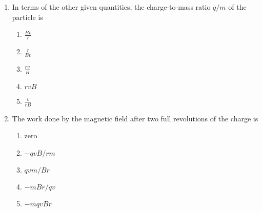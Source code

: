 \documentclass{../../oss-apphys}
\begin{document}
\begin{multicols}{2}
  \begin{enumerate}[leftmargin=18pt,resume]
  \item In terms of the other given quantities, the charge-to-mass ratio $q/m$
    of the particle is
    \begin{enumerate}[noitemsep,topsep=0pt,leftmargin=18pt,label=(\Alph*)]
    \item $\displaystyle\frac{Bv}{r}$
    \item $\displaystyle\frac{r}{Bv}$
    \item $\displaystyle\frac{rv}{B}$
    \item $rvB$
    \item $\displaystyle\frac{v}{rB}$
    \end{enumerate}
    
  \item The work done by the magnetic field after two full revolutions of the
    charge is
    \begin{enumerate}[noitemsep,topsep=0pt,leftmargin=18pt,label=(\Alph*)]
    \item zero
    \item $-qvB/rm$
    \item $qvm/Br$
    \item $-mBr/qv$
    \item $-mqvBr$
    \end{enumerate}
    
    

\end{enumerate}
\end{multicols}
\end{document}
